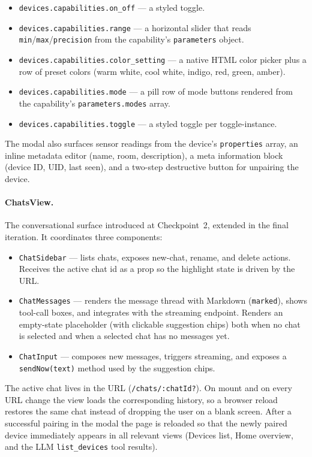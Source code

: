 \documentclass[a4paper,12pt]{article}
\begin{document}
\begin{itemize}
  \item \verb|devices.capabilities.on_off| --- a styled toggle.
  \item \verb|devices.capabilities.range| --- a horizontal slider that reads \verb|min|/\verb|max|/\verb|precision| from the capability's \verb|parameters| object.
  \item \verb|devices.capabilities.color_setting| --- a native HTML color picker plus a row of preset colors (warm white, cool white, indigo, red, green, amber).
  \item \verb|devices.capabilities.mode| --- a pill row of mode buttons rendered from the capability's \verb|parameters.modes| array.
  \item \verb|devices.capabilities.toggle| --- a styled toggle per toggle-instance.
\end{itemize}

The modal also surfaces sensor readings from the device's \verb|properties| array, an inline metadata editor (name, room, description), a meta information block (device ID, UID, last seen), and a two-step destructive button for unpairing the device.

\paragraph{ChatsView.} The conversational surface introduced at Checkpoint~2, extended in the final iteration. It coordinates three components:

\begin{itemize}
  \item \verb|ChatSidebar| --- lists chats, exposes new-chat, rename, and delete actions. Receives the active chat id as a prop so the highlight state is driven by the URL.
  \item \verb|ChatMessages| --- renders the message thread with Markdown (\verb|marked|), shows tool-call boxes, and integrates with the streaming endpoint. Renders an empty-state placeholder (with clickable suggestion chips) both when no chat is selected and when a selected chat has no messages yet.
  \item \verb|ChatInput| --- composes new messages, triggers streaming, and exposes a \verb|sendNow(text)| method used by the suggestion chips.
\end{itemize}

The active chat lives in the URL (\verb|/chats/:chatId?|). On mount and on every URL change the view loads the corresponding history, so a browser reload restores the same chat instead of dropping the user on a blank screen. After a successful pairing in the modal the page is reloaded so that the newly paired device immediately appears in all relevant views (Devices list, Home overview, and the LLM \verb|list_devices| tool results).
\end{document}

